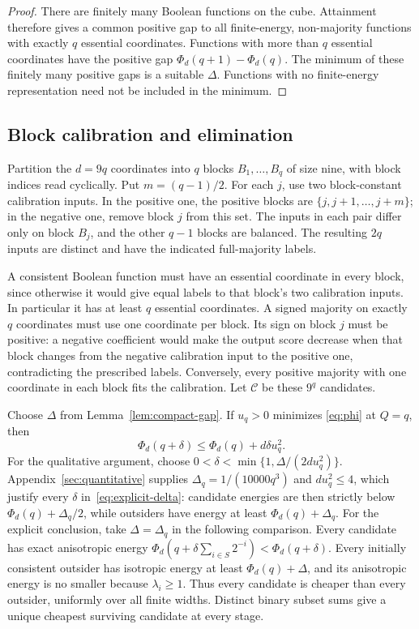 \documentclass[11pt]{article}
\begin{document}
\begin{proof}
There are finitely many Boolean functions on the cube. Attainment
therefore gives a common positive gap to all finite-energy,
non-majority functions with exactly $q$ essential coordinates.
Functions with more than $q$ essential coordinates have the positive
gap $\Phi_d(q+1)-\Phi_d(q)$. The minimum of these finitely many
positive gaps is a suitable $\Delta$. Functions with no finite-energy
representation need not be included in the minimum.
\end{proof}

\subsection{Block calibration and elimination}

Partition the $d=9q$ coordinates into $q$ blocks $B_1,\ldots,B_q$
of size nine, with block indices read cyclically. Put $m=(q-1)/2$.
For each $j$, use two block-constant calibration inputs. In the
positive one, the positive blocks are
$\{j,j+1,\ldots,j+m\}$; in the negative one, remove block $j$ from
this set. The inputs in each pair differ only on block $B_j$, and
the other $q-1$ blocks are balanced. The resulting $2q$ inputs are
distinct and have the indicated full-majority labels.

A consistent Boolean function must have an essential coordinate in
every block, since otherwise it would give equal labels to that
block's two calibration inputs. In particular it has at least $q$
essential coordinates. A signed majority on exactly $q$ coordinates
must use one coordinate per block. Its sign on block $j$ must be
positive: a negative coefficient would make the output score
decrease when that block changes from the negative calibration
input to the positive one, contradicting the prescribed labels.
Conversely, every positive majority with one coordinate in each
block fits the calibration. Let $\mathcal C$ be these $9^q$ candidates.

Choose $\Delta$ from Lemma~\ref{lem:compact-gap}. If $u_q>0$ minimizes
\eqref{eq:phi} at $Q=q$, then
\[
 \Phi_d(q+\delta)\le\Phi_d(q)+d\delta u_q^2.
\]
For the qualitative argument, choose
$0<\delta<\min\{1,\Delta/(2du_q^2)\}$.
Appendix~\ref{sec:quantitative} supplies
$\Delta_q=1/(10000q^3)$ and $du_q^2\le4$, which justify every
$\delta$ in~\eqref{eq:explicit-delta}: candidate energies are then
strictly below $\Phi_d(q)+\Delta_q/2$, while outsiders have energy
at least $\Phi_d(q)+\Delta_q$. For the explicit conclusion, take
$\Delta=\Delta_q$ in the following comparison.
Every candidate has exact anisotropic energy
$\Phi_d(q+\delta\sum_{i\in S}2^{-i})<\Phi_d(q+\delta)$.
Every initially consistent outsider has isotropic energy at least
$\Phi_d(q)+\Delta$, and its anisotropic energy is no smaller because
$\lambda_i\ge1$. Thus every candidate is cheaper than every outsider,
uniformly over all finite widths. Distinct binary subset sums give
a unique cheapest surviving candidate at every stage.
\end{document}
